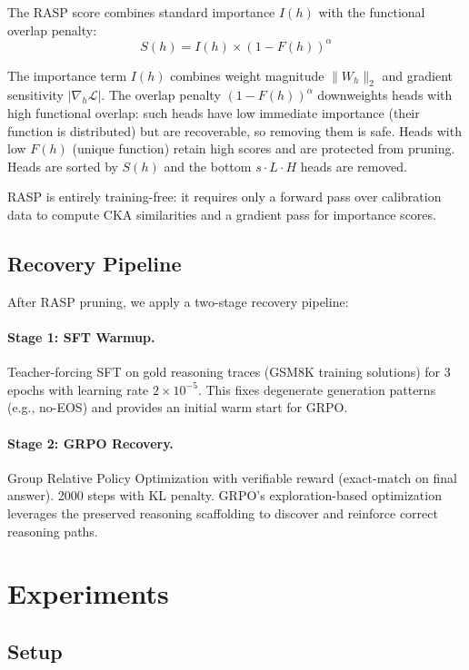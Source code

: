 \documentclass[11pt,a4paper]{article}
\begin{document}
The RASP score combines standard importance $I(h)$ with the functional overlap penalty:
\begin{equation}
S(h) = I(h) \times (1 - F(h))^\alpha
\end{equation}

The importance term $I(h)$ combines weight magnitude $\|W_h\|_2$ and gradient sensitivity $|\nabla_h \mathcal{L}|$. The overlap penalty $(1-F(h))^\alpha$ downweights heads with high functional overlap: such heads have low immediate importance (their function is distributed) but are recoverable, so removing them is safe. Heads with low $F(h)$ (unique function) retain high scores and are protected from pruning. Heads are sorted by $S(h)$ and the bottom $s \cdot L \cdot H$ heads are removed.

RASP is entirely training-free: it requires only a forward pass over calibration data to compute CKA similarities and a gradient pass for importance scores.

\subsection{Recovery Pipeline}

After RASP pruning, we apply a two-stage recovery pipeline:

\paragraph{Stage 1: SFT Warmup.} Teacher-forcing SFT on gold reasoning traces (GSM8K training solutions) for 3 epochs with learning rate $2 \times 10^{-5}$. This fixes degenerate generation patterns (e.g., no-EOS) and provides an initial warm start for GRPO.

\paragraph{Stage 2: GRPO Recovery.} Group Relative Policy Optimization \cite{grpo2024} with verifiable reward (exact-match on final answer). 2000 steps with KL penalty. GRPO's exploration-based optimization leverages the preserved reasoning scaffolding to discover and reinforce correct reasoning paths.

\section{Experiments}

\subsection{Setup}
\end{document}
